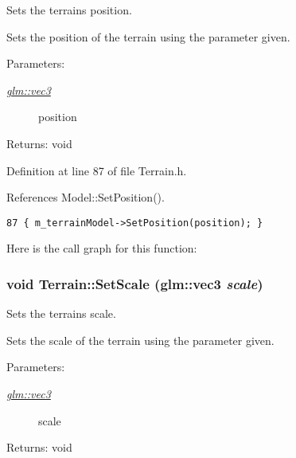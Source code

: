 Sets the terrains position. 

Sets the position of the terrain using the parameter given.

\begin{Desc}
\item[Parameters:]
\begin{description}
\item[{\em \hyperlink{group__core__types_g1c47e8b3386109bc992b6c48e91b0be7}{glm::vec3}}]position \end{description}
\end{Desc}
\begin{Desc}
\item[Returns:]void \end{Desc}


Definition at line 87 of file Terrain.h.

References Model::SetPosition().

\begin{Code}\begin{verbatim}87 { m_terrainModel->SetPosition(position); }
\end{verbatim}
\end{Code}




Here is the call graph for this function:\hypertarget{class_terrain_ebecef9a3ffd4cedb898013e7087ec58}{
\subsubsection[SetScale]{\setlength{\rightskip}{0pt plus 5cm}void Terrain::SetScale ({\bf glm::vec3} {\em scale})}}
\label{class_terrain_ebecef9a3ffd4cedb898013e7087ec58}


Sets the terrains scale. 

Sets the scale of the terrain using the parameter given.

\begin{Desc}
\item[Parameters:]
\begin{description}
\item[{\em \hyperlink{group__core__types_g1c47e8b3386109bc992b6c48e91b0be7}{glm::vec3}}]scale \end{description}
\end{Desc}
\begin{Desc}
\item[Returns:]void \end{Desc}


